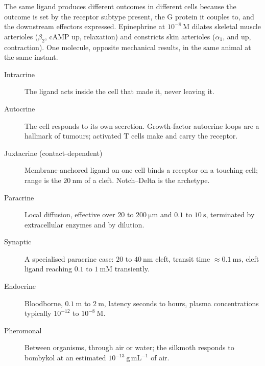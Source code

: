 \begin{thmbox}[title={PRINCIPLE: the response is a property of the target, not the signal}]
The same ligand produces different outcomes in different cells because the outcome is
set by the receptor subtype present, the G protein it couples to, and the downstream
effectors expressed. Epinephrine at $10^{-8}\ \mathrm{M}$ dilates skeletal muscle
arterioles ($\beta_2$, cAMP up, relaxation) and constricts skin arterioles
($\alpha_1$,  and  up, contraction). One molecule, opposite
mechanical results, in the same animal at the same instant.
\end{thmbox}

\begin{defbox}[title={DEFINITIONS: distance classes of signalling}]
\begin{description}
\item[Intracrine] The ligand acts inside the cell that made it, never leaving it.
\item[Autocrine] The cell responds to its own secretion. Growth-factor autocrine
loops are a hallmark of tumours; activated T cells make  and carry the
 receptor.
\item[Juxtacrine (contact-dependent)] Membrane-anchored ligand on one cell binds a
receptor on a touching cell; range is the $20\ \mathrm{nm}$ of a cleft. Notch--Delta
is the archetype.
\item[Paracrine] Local diffusion, effective over $20$ to $200\ \mathrm{\mu m}$ and
$0.1$ to $10\ \mathrm{s}$, terminated by extracellular enzymes and by dilution.
\item[Synaptic] A specialised paracrine case: $20$ to $40\ \mathrm{nm}$ cleft,
transit time $\approx 0.1\ \mathrm{ms}$, cleft ligand reaching $0.1$ to
$1\ \mathrm{mM}$ transiently.
\item[Endocrine] Bloodborne, $0.1\ \mathrm{m}$ to $2\ \mathrm{m}$, latency seconds to
hours, plasma concentrations typically $10^{-12}$ to $10^{-8}\ \mathrm{M}$.
\item[Pheromonal] Between organisms, through air or water; the silkmoth responds to
bombykol at an estimated $10^{-13}\ \mathrm{g\,mL^{-1}}$ of air.
\end{description}
\end{defbox}

